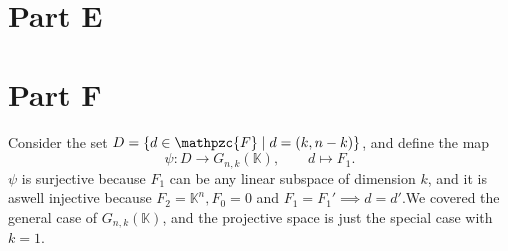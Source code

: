 \documentclass[]{article}
\begin{document}
\section{Part E}

\section{Part F}
Consider the set $ D=\{d\in\mathpzc{F} \mid d=(k,n-k)\} $, and define the map $$ \psi:D\to G_{n,k}(\mathbb{K}), \qquad d\mapsto F_1. $$ $\psi$ is surjective because $F_1$ can be any linear subspace of dimension $k$, and it is aswell injective because $F_2 = \mathbb{K}^n, F_0 = {0} $ and $F_1=F_1' \implies d=d'$.We covered the general case of $G_{n,k}(\mathbb{K})$, and the projective space is just the special case with $k=1$. 
\end{document}
